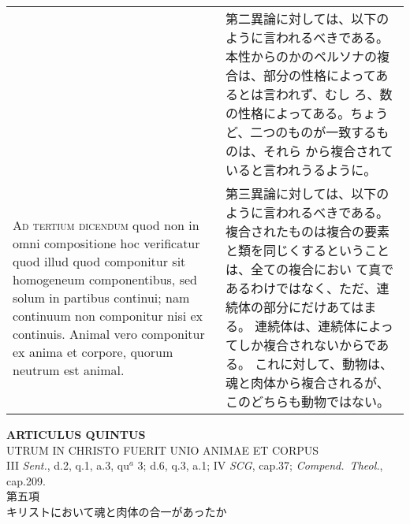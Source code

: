 \documentclass[10pt]{jsarticle} %
\begin{document}
\begin{longtable}{p{21em}p{21em}}
&

第二異論に対しては、以下のように言われるべきである。
本性からのかのペルソナの複合は、部分の性格によってあるとは言われず、むし
 ろ、数の性格によってある。ちょうど、二つのものが一致するものは、それら
 から複合されていると言われうるように。


\\



{\scshape Ad tertium dicendum} quod non in omni compositione hoc verificatur quod
illud quod componitur sit homogeneum componentibus, sed solum in
partibus continui; nam continuum non componitur nisi ex
continuis. Animal vero componitur ex anima et corpore, quorum neutrum
est animal.


&


第三異論に対しては、以下のように言われるべきである。
複合されたものは複合の要素と類を同じくするということは、全ての複合におい
 て真であるわけではなく、ただ、連続体の部分にだけあてはまる。
連続体は、連続体によってしか複合されないからである。
これに対して、動物は、魂と肉体から複合されるが、このどちらも動物ではない。

\\

\end{longtable}
\newpage


\begin{center}
 {\Large {\bf ARTICULUS QUINTUS}}\\
 {\large UTRUM IN CHRISTO FUERIT UNIO ANIMAE ET CORPUS}\\
 {\footnotesize III {\itshape Sent.}, d.2, q.1, a.3, qu$^a$ 3; d.6, q.3,
 a.1; IV {\itshape SCG}, cap.37; {\itshape Compend.~Theol.}, cap.209.}\\
 {\Large 第五項\\キリストにおいて魂と肉体の合一があったか}
\end{center}
\end{document}
